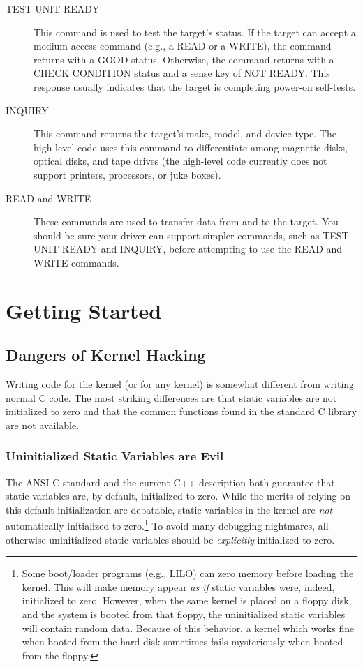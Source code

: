 \begin{description}
\item[TEST UNIT READY] This command is used to test the target's status.
  If the target can accept a medium-access command (e.g., a READ or a
  WRITE), the command returns with a GOOD status.  Otherwise, the command
  returns with a CHECK CONDITION status and a sense key of NOT READY\@.
  This response usually indicates that the target is completing power-on
  self-tests.
\item[INQUIRY] This command returns the target's make, model, and device
  type.  The high-level \Linux{} code uses this command to differentiate
  among magnetic disks, optical disks, and tape drives (the high-level code
  currently does not support printers, processors, or juke boxes).
\item[READ and WRITE] These commands are used to transfer data from and to
  the target.  You should be sure your driver can support simpler commands,
  such as TEST UNIT READY and INQUIRY, before attempting to use the READ and
  WRITE commands.
\end{description}



\section{Getting Started}


\subsection{Dangers of Kernel Hacking}

Writing code for the \Linux{} kernel (or for any kernel) is somewhat
different from writing normal C code.  The most striking differences are
that static variables are not initialized to zero and that the common
functions found in the standard C library are not available.


\subsubsection{Uninitialized Static Variables are Evil}

The ANSI C standard \cite[p.~40]{k.and.r} and the current C++ description
\cite[pp.~19 and~150]{the.arm} both guarantee that static variables are, by
default, initialized to zero.  While the merits of relying on this default
initialization are debatable, static variables in the kernel are {\em
  not\/} automatically initialized to zero.\footnote{Some boot/loader
  programs (e.g., LILO) can zero memory before loading the kernel.  This
  will make memory appear {\em as if\/} static variables were, indeed,
  initialized to zero.  However, when the same kernel is placed on a floppy
  disk, and the system is booted from that floppy, the uninitialized static
  variables will contain random data.  Because of this behavior, a kernel
  which works fine when booted from the hard disk sometimes fails
  mysteriously when booted from the floppy.} To avoid many debugging
nightmares, all otherwise uninitialized static variables should be {\em
  explicitly\/} initialized to zero.


